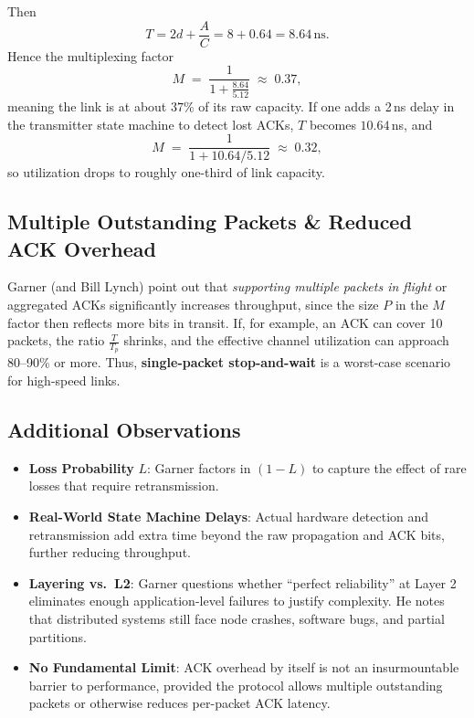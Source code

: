 \documentclass[../../../OAE-SPEC-MAIN.tex]{subfiles}
\begin{document}
Then
\[
  T = 2d + \frac{A}{C} = 8 + 0.64 = 8.64\,\text{ns}.
\]
Hence the multiplexing factor
\[
  M \;=\; \frac{1}{1 + \frac{8.64}{5.12}} \;\approx\; 0.37,
\]
meaning the link is at about $37\%$ of its raw capacity. If one adds a 2\,ns delay in the transmitter state machine to detect lost ACKs, $T$ becomes $10.64$\,ns, and
\[
  M \;=\; \frac{1}{1 + 10.64/5.12} \;\approx\; 0.32,
\]
so utilization drops to roughly one-third of link capacity.


\subsection{Multiple Outstanding Packets \& Reduced ACK Overhead}

Garner (and Bill Lynch) point out that \emph{supporting multiple packets in flight} or aggregated ACKs significantly increases throughput, since the size $P$ in the $M$ factor then reflects more bits in transit. If, for example, an ACK can cover 10 packets, the ratio $\frac{T}{T_p}$ shrinks, and the effective channel utilization can approach 80--90\% or more. Thus, \textbf{single-packet stop-and-wait} is a worst-case scenario for high-speed links.


\subsection{Additional Observations}

\begin{itemize}
\item \textbf{Loss Probability} $L$: Garner factors in $(1 - L)$ to capture the effect of rare losses that require retransmission.
\item \textbf{Real-World State Machine Delays}: Actual hardware detection and retransmission add extra time beyond the raw propagation and ACK bits, further reducing throughput.
\item \textbf{Layering vs.\ L2}: Garner questions whether ``perfect reliability'' at Layer 2 eliminates enough application-level failures to justify complexity. He notes that distributed systems still face node crashes, software bugs, and partial partitions.
\item \textbf{No Fundamental Limit}: ACK overhead by itself is not an insurmountable barrier to performance, provided the protocol allows multiple outstanding packets or otherwise reduces per-packet ACK latency.
\end{itemize}
\end{document}
